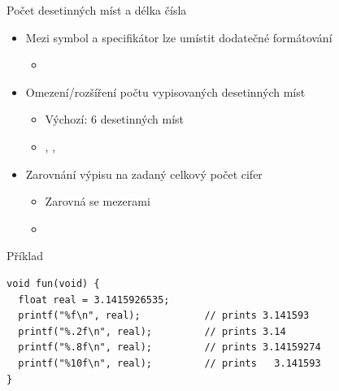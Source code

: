 \begin{frame}[fragile]{Počet desetinných míst a délka čísla}

  \begin{itemize}
    \item Mezi symbol \code{\%} a specifikátor lze umístit dodatečné formátování
    \begin{itemize}
      \item {}
    \end{itemize}

    \pause

    \item Omezení/rozšíření počtu vypisovaných desetinných míst
    \begin{itemize}
      \item Výchozí: 6 desetinných míst
      \item {}, , 
    \end{itemize}

    \pause

    \item Zarovnání výpisu na zadaný celkový počet cifer
    \begin{itemize}
      \item Zarovná se mezerami
      \item {}
    \end{itemize}

  \end{itemize}

  \pause

\begin{block}{Příklad}
\begin{lstlisting}
void fun(void) {
  float real = 3.1415926535;
  printf("%f\n", real);           // prints 3.141593
  printf("%.2f\n", real);         // prints 3.14
  printf("%.8f\n", real);         // prints 3.14159274
  printf("%10f\n", real);         // prints   3.141593
}
\end{lstlisting}
\end{block}

\end{frame}

